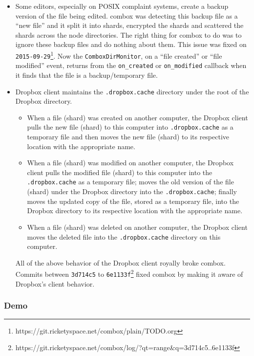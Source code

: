 \begin{itemize}
\item Some editors, especially on POSIX complaint systems, create a
  backup version of the file being edited. combox was detecting this
  backup file as a ``new file'' and it split it into shards, encrypted
  the shards and scattered the shards across the node directories. The
  right thing for combox to do was to ignore these backup files and do
  nothing about them. This issue was fixed on
  \verb+2015-09-29+\footnote{https://git.ricketyspace.net/combox/plain/TODO.org}. Now
  the \verb+ComboxDirMonitor+, on a ``file created'' or ``file
  modified'' event, returns from the \verb+on_created+ or
  \verb+on_modified+ callback when it finds that the file is a
  backup/temporary file.
\item Dropbox client maintains the \verb+.dropbox.cache+ directory
  under the root of the Dropbox directory.

  \begin{itemize}
  \item When a file (shard) was created on another computer, the
    Dropbox client pulls the new file (shard) to this computer into
    \verb+.dropbox.cache+ as a temporary file and then moves the new
    file (shard) to its respective location with the appropriate name.
  \item When a file (shard) was modified on another computer, the
    Dropbox client pulls the modified file (shard) to this computer
    into the \verb+.dropbox.cache+ as a temporary file; moves the old
    version of the file (shard) under the Dropbox directory into the
    \verb+.dropbox.cache+; finally moves the updated copy of the file,
    stored as a temporary file, into the Dropbox directory to its
    respective location with the appropriate name.
  \item When a file (shard) was deleted on another computer, the
    Dropbox client moves the deleted file into the
    \verb+.dropbox.cache+ directory on this computer.
  \end{itemize}

  All of the above behavior of the Dropbox client royally broke
  combox. Commits between \verb+3d714c5+ to
  \verb+6e1133f+\footnote{https://git.ricketyspace.net/combox/log/?qt=range\&q=3d714c5..6e1133f}
  fixed combox by making it aware of Dropbox's client behavior.
\end{itemize}

\subsubsection{Demo}

